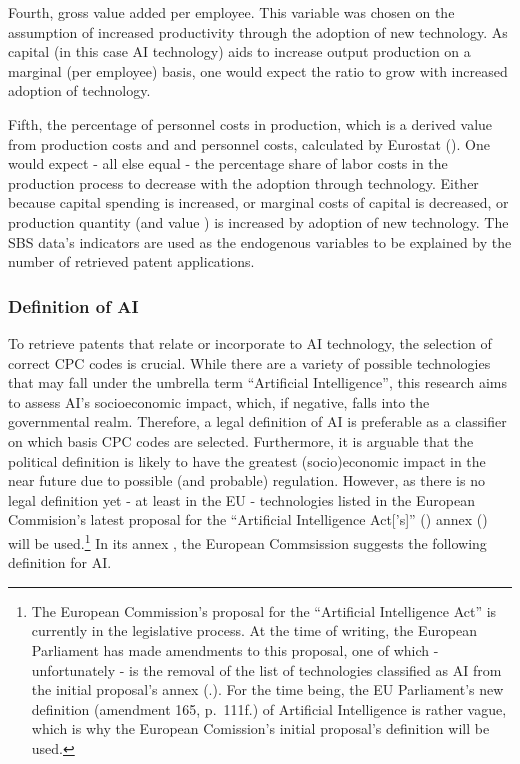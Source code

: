 \documentclass[
  12pt,
  a4paperpaper,
]{article}
\begin{document}
Fourth, gross value added per employee. This variable was chosen on the
assumption of increased productivity through the adoption of new
technology. As capital (in this case AI technology) aids to increase
output production on a marginal (per employee) basis, one would expect
the ratio to grow with increased adoption of technology.

Fifth, the percentage of personnel costs in production, which is a
derived value from production costs and and personnel costs, calculated
by Eurostat
(). One would expect - all else equal -
the percentage share of labor costs in the production process to
decrease with the adoption through technology. Either because capital
spending is increased, or marginal costs of capital is decreased, or
production quantity (and value ) is increased by adoption of new
technology. The SBS data's indicators are used as the endogenous
variables to be explained by the number of retrieved patent
applications.

\subsubsection{Definition of AI}\label{definition-of-ai}

To retrieve patents that relate or incorporate to AI technology, the
selection of correct CPC codes is crucial. While there are a variety of
possible technologies that may fall under the umbrella term ``Artificial
Intelligence'', this research aims to assess AI's socioeconomic impact,
which, if negative, falls into the governmental realm. Therefore, a
legal definition of AI is preferable as a classifier on which basis CPC
codes are selected. Furthermore, it is arguable that the political
definition is likely to have the greatest (socio)economic impact in the
near future due to possible (and probable) regulation. However, as there
is no legal definition yet - at least in the EU - technologies listed in
the European Commision's latest proposal for the ``Artificial
Intelligence Act{[}'s{]}''
() annex () will be used.\footnote{The European Commission's
  proposal for the ``Artificial Intelligence Act'' is currently in the
  legislative process. At the time of writing, the European Parliament
  has made amendments to this proposal, one of which - unfortunately -
  is the removal of the list of technologies classified as AI from the
  initial proposal's annex
  (.). For the time being, the EU Parliament's new
  definition (amendment 165, p.~111f.) of Artificial Intelligence is
  rather vague, which is why the European Comission's initial proposal's
  definition will be used.} In its annex , the European
Commsission suggests the following definition for AI.
\end{document}
